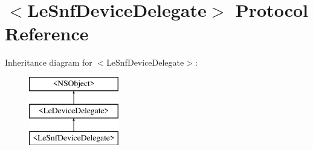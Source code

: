 \hypertarget{protocol_le_snf_device_delegate-p}{}\section{$<$Le\+Snf\+Device\+Delegate$>$ Protocol Reference}
\label{protocol_le_snf_device_delegate-p}
Inheritance diagram for $<$Le\+Snf\+Device\+Delegate$>$\+:\begin{figure}[H]
\begin{center}
\leavevmode
\includegraphics[height=3.000000cm]{protocol_le_snf_device_delegate-p}
\end{center}
\end{figure}
